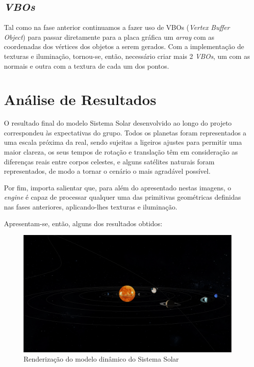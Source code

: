 \documentclass[a4paper, 11pt]{article}
\begin{document}
\subsection{\textit{VBOs}}

Tal como na fase anterior continuamos a fazer uso de VBOs (\textit{Vertex Buffer Object}) para 
passar diretamente para a placa gráfica um \textit{array} com as coordenadas dos vértices dos 
objetos a serem gerados. Com a implementação de texturas e iluminação, tornou-se, então, 
necessário criar  mais 2 \textit{VBOs}, um com as normais e outra com a textura de cada um dos 
pontos.


\pagebreak

\section{Análise de Resultados}

O resultado final do modelo Sistema Solar desenvolvido ao longo do projeto correspondeu às 
expectativas do grupo. Todos os planetas foram representados a uma escala próxima da real, sendo 
sujeitas a ligeiros ajustes para permitir uma maior clareza, os seus tempos de rotação e 
translação têm em  consideração as diferenças reais entre corpos celestes, e alguns 
satélites naturais foram representados, de modo a tornar o cenário o mais agradável possível.

Por fim, importa salientar que, para além do apresentado nestas imagens, o \textit{engine} é 
capaz de processar qualquer uma das primitivas geométricas definidas nas fases anteriores, 
aplicando-lhes texturas e iluminação.

Apresentam-se, então, alguns dos resultados obtidos:

\vspace{1cm}

\begin{figure}[H]
    \centering
    \includegraphics[width=\textwidth]{img/ex1.png}
    \caption{Renderização do modelo dinâmico do Sistema Solar}
\end{figure}
\end{document}
